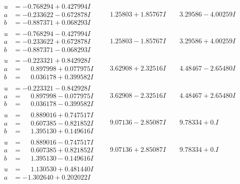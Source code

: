 \documentclass[1p]{elsarticle_modified}
\theoremstyle{definition}
\begin{document}
$$\begin{array}{c|c|c}
\begin{aligned}
u &= -0.768294 + 0.427994 I \\
a &= -0.233622 - 0.672878 I \\
b &= -0.887371 + 0.068293 I\end{aligned}
 & \phantom{-}1.25803 + 1.85767 I & \phantom{-}3.29586 - 4.00259 I \\ \hline\begin{aligned}
u &= -0.768294 - 0.427994 I \\
a &= -0.233622 + 0.672878 I \\
b &= -0.887371 - 0.068293 I\end{aligned}
 & \phantom{-}1.25803 - 1.85767 I & \phantom{-}3.29586 + 4.00259 I \\ \hline\begin{aligned}
u &= -0.223321 + 0.842928 I \\
a &= \phantom{-}0.897998 + 0.077975 I \\
b &= \phantom{-}0.036178 + 0.399582 I\end{aligned}
 & \phantom{-}3.62908 + 2.32516 I & \phantom{-}4.48467 - 2.65480 I \\ \hline\begin{aligned}
u &= -0.223321 - 0.842928 I \\
a &= \phantom{-}0.897998 - 0.077975 I \\
b &= \phantom{-}0.036178 - 0.399582 I\end{aligned}
 & \phantom{-}3.62908 - 2.32516 I & \phantom{-}4.48467 + 2.65480 I \\ \hline\begin{aligned}
u &= \phantom{-}0.889016 + 0.747517 I \\
a &= \phantom{-}0.607385 - 0.821852 I \\
b &= \phantom{-}1.395130 + 0.149616 I\end{aligned}
 & \phantom{-}9.07136 - 2.85087 I & \phantom{-}9.78334 + 0. I\phantom{ +0.000000I} \\ \hline\begin{aligned}
u &= \phantom{-}0.889016 - 0.747517 I \\
a &= \phantom{-}0.607385 + 0.821852 I \\
b &= \phantom{-}1.395130 - 0.149616 I\end{aligned}
 & \phantom{-}9.07136 + 2.85087 I & \phantom{-}9.78334 + 0. I\phantom{ +0.000000I} \\ \hline\begin{aligned}
u &= \phantom{-}1.130530 + 0.481440 I \\
a &= -1.302640 + 0.202022 I \\

\end{aligned}
\end{array}$$
\end{document}

